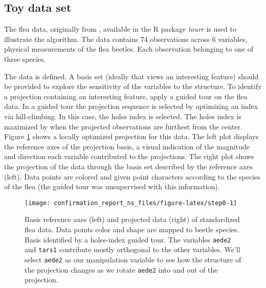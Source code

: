 \documentclass{monashthesis}
\begin{document}
\subsection{Toy data set}\label{toy-data-set}

The flea data, originally from \textcite{lubischew_use_1962}, available
in the R package \emph{tourr} \autocite{wickham_tourr_2011} is used to
illustrate the algorithm. The data contains 74 observations across 6
variables, physical measurements of the flea beetles. Each observation
belonging to one of three species.

The data is defined. A basis set (ideally that views an interesting
feature) should be provided to explore the sensitivity of the variables
to the structure. To identify a projection containing an interesting
feature, apply a guided tour\autocite{cook_interactive_2007} on the flea
data. In a guided tour the projection sequence is selected by optimizing
an index via hill-climbing. In this case, the holes index is selected.
The holes index is maximized by when the projected observations are
furthest from the center. Figure \ref{fig:step0} shows a locally
optimized projection for this data. The left plot displays the reference
axes of the projection basis, a visual indication of the magnitude and
direction each variable contributed to the projections. The right plot
shows the projection of the data through the basis set described by the
reference axes (left). Data points are colored and given point
characters according to the species of the flea (the guided tour was
unsupervised with this information).









\begin{figure}

{\centering \texttt{[image: confirmation\_report\_ns\_files/figure-latex/step0-1]} 

}

\caption{Basis reference axes (left) and projected data (right)
of standardized flea data. Data points color and shape are mapped to
beetle species. Basis identified by a holes-index guided tour. The
variables \texttt{aede2} and \texttt{tars1} contribute mostly orthogonal
to the other variables. We'll select \texttt{aede2} as our manipulation
variable to see how the structure of the projection changes as we rotate
\texttt{aede2} into and out of the projection.}\label{fig:step0}
\end{figure}
\end{document}
